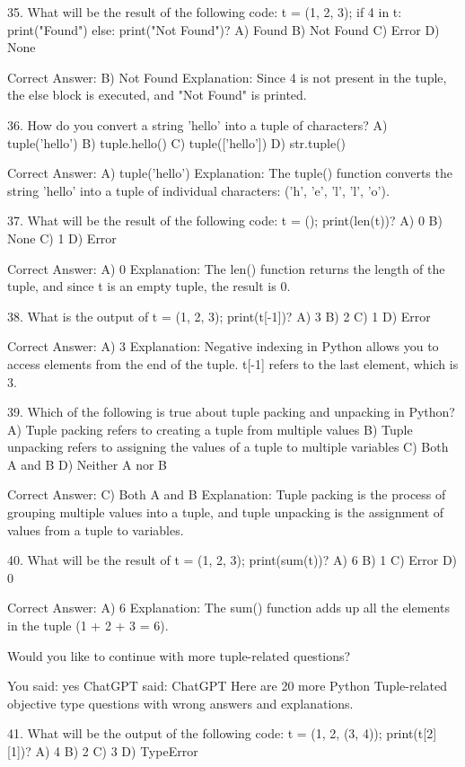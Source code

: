 35. What will be the result of the following code: t = (1, 2, 3); if 4 in t: print("Found") else: print("Not Found")?
A) Found
B) Not Found
C) Error
D) None

Correct Answer: B) Not Found
Explanation: Since 4 is not present in the tuple, the else block is executed, and "Not Found" is printed.

36. How do you convert a string 'hello' into a tuple of characters?
A) tuple('hello')
B) tuple.hello()
C) tuple(['hello'])
D) str.tuple()

Correct Answer: A) tuple('hello')
Explanation: The tuple() function converts the string 'hello' into a tuple of individual characters: ('h', 'e', 'l', 'l', 'o').

37. What will be the result of the following code: t = (); print(len(t))?
A) 0
B) None
C) 1
D) Error

Correct Answer: A) 0
Explanation: The len() function returns the length of the tuple, and since t is an empty tuple, the result is 0.

38. What is the output of t = (1, 2, 3); print(t[-1])?
A) 3
B) 2
C) 1
D) Error

Correct Answer: A) 3
Explanation: Negative indexing in Python allows you to access elements from the end of the tuple. t[-1] refers to the last element, which is 3.

39. Which of the following is true about tuple packing and unpacking in Python?
A) Tuple packing refers to creating a tuple from multiple values
B) Tuple unpacking refers to assigning the values of a tuple to multiple variables
C) Both A and B
D) Neither A nor B

Correct Answer: C) Both A and B
Explanation: Tuple packing is the process of grouping multiple values into a tuple, and tuple unpacking is the assignment of values from a tuple to variables.

40. What will be the result of t = (1, 2, 3); print(sum(t))?
A) 6
B) 1
C) Error
D) 0

Correct Answer: A) 6
Explanation: The sum() function adds up all the elements in the tuple (1 + 2 + 3 = 6).

Would you like to continue with more tuple-related questions?






You said:
yes
ChatGPT said:
ChatGPT
Here are 20 more Python Tuple-related objective type questions with wrong answers and explanations.

41. What will be the output of the following code: t = (1, 2, (3, 4)); print(t[2][1])?
A) 4
B) 2
C) 3
D) TypeError

